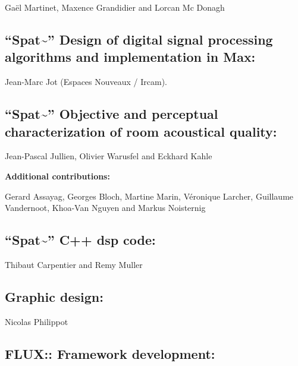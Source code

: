 \documentclass[
  letterpaper,
  DIV=11,
  numbers=noendperiod]{scrreport}
\begin{document}
Gaël Martinet, Maxence Grandidier and Lorcan Mc Donagh

\hypertarget{spat-design-of-digital-signal-processing-algorithms-and-implementation-in-max}{%
\subsection{\texorpdfstring{``Spat\textasciitilde{}'' Design of digital
signal processing algorithms and implementation in
Max:}{``Spat\textasciitilde'' Design of digital signal processing algorithms and implementation in Max:}}\label{spat-design-of-digital-signal-processing-algorithms-and-implementation-in-max}}

Jean-Marc Jot (Espaces Nouveaux / Ircam).

\hypertarget{spat-objective-and-perceptual-characterization-of-room-acoustical-quality}{%
\subsection{\texorpdfstring{``Spat\textasciitilde{}'' Objective and
perceptual characterization of room acoustical
quality:}{``Spat\textasciitilde'' Objective and perceptual characterization of room acoustical quality:}}\label{spat-objective-and-perceptual-characterization-of-room-acoustical-quality}}

Jean-Pascal Jullien, Olivier Warusfel and Eckhard Kahle

\textbf{Additional contributions:}

Gerard Assayag, Georges Bloch, Martine Marin, Véronique Larcher,
Guillaume Vandernoot, Khoa-Van Nguyen and Markus Noisternig

\hypertarget{spat-c-dsp-code}{%
\subsection{\texorpdfstring{``Spat\textasciitilde{}'' C++ dsp
code:}{``Spat\textasciitilde'' C++ dsp code:}}\label{spat-c-dsp-code}}

Thibaut Carpentier and Remy Muller

\hypertarget{graphic-design}{%
\subsection{Graphic design:}\label{graphic-design}}

Nicolas Philippot

\hypertarget{flux-framework-development}{%
\subsection{FLUX:: Framework
development:}\label{flux-framework-development}}
\end{document}
